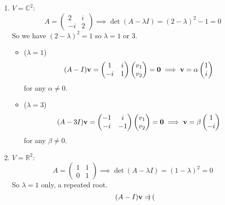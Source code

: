 \begin{enumerate}
	\item \(V = \mathbb C^2\):
	      \[
		      A = \begin{pmatrix}
			      2 & i \\ -i & 2
		      \end{pmatrix} \implies \det(A - \lambda I) = (2-\lambda)^2 - 1 = 0
	      \]
	      So we have \((2 - \lambda)^2 = 1\) so \(\lambda = 1\) or 3.
	      \begin{itemize}
		      \item (\(\lambda = 1\))
		            \[
			            (A - I)\vb v = \begin{pmatrix}
				            1 & i \\ -i & 1
			            \end{pmatrix}\begin{pmatrix}
				            v_1 \\ v_2
			            \end{pmatrix} = \vb 0 \implies \vb v = \alpha\begin{pmatrix}
				            1 \\ i
			            \end{pmatrix}
		            \]
		            for any \(\alpha \neq 0\).
		      \item (\(\lambda = 3\))
		            \[
			            (A - 3I)\vb v = \begin{pmatrix}
				            -1 & i \\ -i & -1
			            \end{pmatrix}\begin{pmatrix}
				            v_1 \\ v_2
			            \end{pmatrix} = \vb 0 \implies \vb v = \beta\begin{pmatrix}
				            1 \\ -i
			            \end{pmatrix}
		            \]
		            for any \(\beta \neq 0\).
	      \end{itemize}
	\item \(V = \mathbb R^2\):
	      \[
		      A = \begin{pmatrix}
			      1 & 1 \\ 0 & 1
		      \end{pmatrix} \implies \det(A - \lambda I) = (1-\lambda)^2 = 0
	      \]
	      So \(\lambda = 1\) only, a repeated root.
	      \[
		      (A - I)\vb v = \begin{pmatrix}

\end{pmatrix}\]
\end{enumerate}
